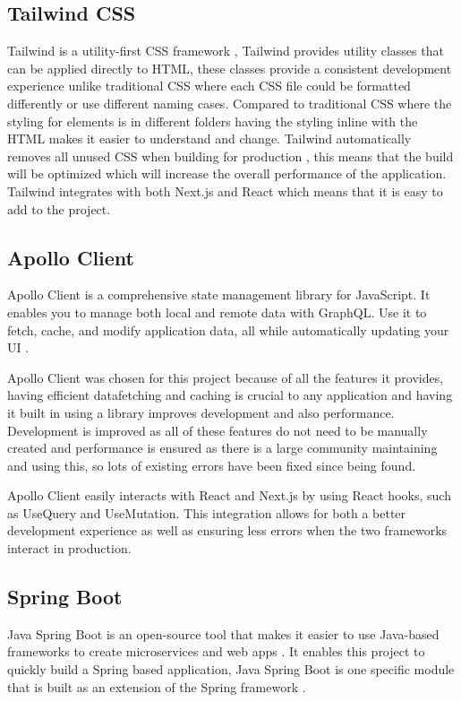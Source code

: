 \documentclass[]{project_report}
\begin{document}
\subsection{Tailwind CSS}

Tailwind is a utility-first CSS framework \cite{tailwindcss}, Tailwind provides utility classes that can be applied directly to HTML, these classes provide a consistent development experience unlike traditional CSS where each CSS file could be formatted differently or use different naming cases. Compared to traditional CSS where the styling for elements is in different folders having the styling inline with the HTML makes it easier to understand and change. Tailwind automatically removes all unused CSS when building for production \cite{tailwindcss}, this means that the build will be optimized which will increase the overall performance of the application. Tailwind integrates with both Next.js and React which means that it is easy to add to the project. 

\subsection{Apollo Client}

Apollo Client is a comprehensive state management library for JavaScript. It enables you to manage both local and remote data with GraphQL. Use it to fetch, cache, and modify application data, all while automatically updating your UI \cite{apollo_client}. 

Apollo Client was chosen for this project because of all the features it provides, having efficient datafetching and caching is crucial to any application and having it built in using a library improves development and also performance. Development is improved as all of these features do not need to be manually created and performance is ensured as there is a large community maintaining and using this, so lots of existing errors have been fixed since being found.

Apollo Client easily interacts with React and Next.js by using React hooks, such as UseQuery and UseMutation. This integration allows for both a better development experience as well as ensuring less errors when the two frameworks interact in production.

\subsection{Spring Boot}

Java Spring Boot is an open-source tool that makes it easier to use Java-based frameworks to create microservices and web apps \cite{spring_boot}. It enables this project to quickly build a Spring based application, Java Spring Boot is one specific module that is built as an extension of the Spring framework \cite{spring_boot}. 
\end{document}
